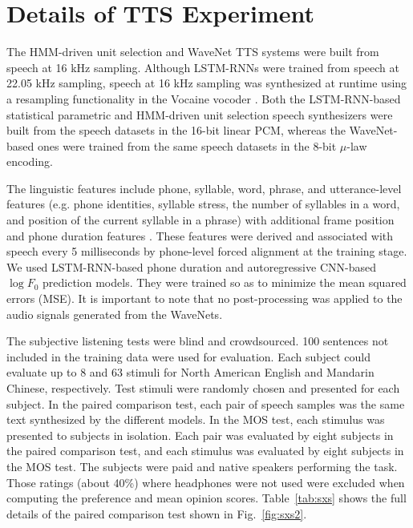 \documentclass{article}
\makeatletter
\newcommand{\figref}[1]{Fig.~\ref{#1}}
\newcommand{\tblref}[1]{Table~\ref{#1}}
\newcommand*{\eg}{e.g.\@\xspace}
\makeatother
\begin{document}
 
\section{Details of TTS Experiment}
\label{appendix:tts_experiment}

The HMM-driven unit selection and WaveNet TTS systems were built from speech at 16 kHz sampling.
Although LSTM-RNNs were trained from speech at 22.05 kHz sampling, 
speech at 16 kHz sampling was synthesized at runtime using a resampling functionality in the Vocaine vocoder \citep{Vocaine}.
Both the LSTM-RNN-based statistical parametric and HMM-driven unit selection speech synthesizers were built from the speech datasets in the 16-bit linear PCM, whereas the WaveNet-based ones were trained from the same speech datasets in the 8-bit $\mu$-law encoding.

The linguistic features include phone, syllable, word, phrase, and utterance-level features \citep{HTS_label} (\eg phone identities, syllable stress, the number of syllables in a word, and position of the current syllable
in a phrase) with additional frame position and phone duration features \citep{Zen_DNN_ICASSP}. These features were derived and associated with speech every 5 milliseconds by phone-level forced alignment at the training stage.
We used LSTM-RNN-based phone duration and autoregressive CNN-based $\log F_0$ prediction models.
They were trained so as to minimize the mean squared errors (MSE).
It is important to note that no post-processing was applied to the audio signals generated from the WaveNets.

The subjective listening tests were blind  and crowdsourced. 
100 sentences not included in the training data were used for evaluation.
Each subject could evaluate up to 8 and 63 stimuli for North American English and Mandarin Chinese, respectively.
Test stimuli were randomly chosen and presented for each subject.
In the paired comparison test, each pair of speech samples was the same text synthesized by the different models.
In the MOS test, each stimulus was presented to subjects in isolation.
Each pair was evaluated by eight subjects in the paired comparison test, and each stimulus was evaluated by eight subjects in the MOS test.
The subjects were paid and native speakers performing the task.
Those ratings (about 40\%) where headphones were not used were excluded when computing the preference and mean opinion scores.
\tblref{tab:sxs} shows the full details of the paired comparison test shown in \figref{fig:sxs2}.
\end{document}
